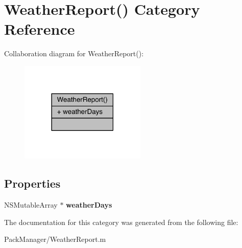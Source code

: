 \hypertarget{category_weather_report_07_08}{\section{Weather\-Report() Category Reference}
\label{category_weather_report_07_08}
}


Collaboration diagram for Weather\-Report()\-:\nopagebreak
\begin{figure}[H]
\begin{center}
\leavevmode
\includegraphics[width=170pt]{category_weather_report_07_08__coll__graph}
\end{center}
\end{figure}
\subsection*{Properties}
\begin{DoxyCompactItemize}
\item 
\hypertarget{category_weather_report_07_08_a87f6dd5f17905c87920e970633f67aa9}{N\-S\-Mutable\-Array $\ast$ {\bfseries weather\-Days}}\label{category_weather_report_07_08_a87f6dd5f17905c87920e970633f67aa9}

\end{DoxyCompactItemize}


The documentation for this category was generated from the following file\-:\begin{DoxyCompactItemize}
\item 
Pack\-Manager/Weather\-Report.\-m\end{DoxyCompactItemize}
